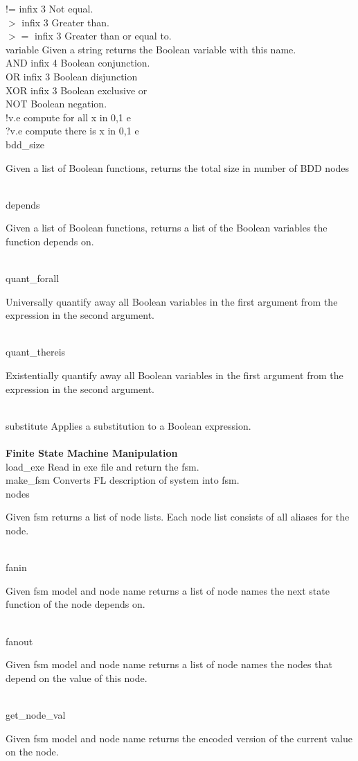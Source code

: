 \begin{tabbing}
!=      \>infix 3 \>Not equal.\\
$>$       \>infix 3 \>Greater than.\\
$>=$      \>infix 3 \>Greater than or equal to.\\
variable     \> \>Given a string returns the Boolean variable with this name.\\
AND     \>infix 4 \>Boolean conjunction.\\
OR      \>infix 3 \>Boolean disjunction\\
XOR     \>infix 3 \>Boolean exclusive or\\
NOT       \>    \>Boolean negation.\\
!v.e       \>   \>compute for all x in {0,1}  e\\
?v.e        \>  \>compute there is x in {0,1}  e\\
bdd\_size     \> \>\parbox[t]{4.5in}{Given a list of Boolean functions, returns the total size in number of BDD nodes}\\
depends   \>    \>\parbox[t]{4.5in}{Given a list of Boolean functions, returns a list of the Boolean variables the function depends on.}\\
quant\_forall\>  \>\parbox[t]{4.5in}{Universally quantify away all Boolean variables in the first argument from the expression in the second argument.}\\
quant\_thereis\> \>\parbox[t]{4.5in}{Existentially quantify away all Boolean variables in the first argument from the expression in the second argument.}\\
substitute   \> \>Applies a substitution to a Boolean expression.\\
\\
{\bf Finite State Machine Manipulation}\\
load\_exe        \>\>Read in exe file and return the fsm.\\
make\_fsm        \>\>Converts FL description of system into fsm.\\
nodes           \>\>\parbox[t]{4.5in}{Given fsm returns a list of node lists. Each node list consists of all aliases for the node.}\\
fanin           \>\>\parbox[t]{4.5in}{Given fsm model and node name returns a list of node names the next state function of the node depends on.}\\
fanout           \>\>\parbox[t]{4.5in}{Given fsm model and node name returns a list of node names the nodes that depend on the value of this node.}\\
get\_node\_val           \>\>\parbox[t]{4.5in}{Given fsm model and node name returns the encoded version of the current value on the node.}\\

\end{tabbing}
